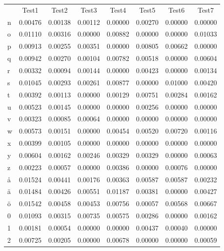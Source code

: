 \begin{tabularx}{\textwidth}{X|c|c|c|c|c|c|c}
 & Test1 & Test2 & Test3 & Test4 & Test5 & Test6 & Test7 \\%
n   & 0.00476 &  0.00138 &  0.00112 &  0.00000 &  0.00270 &  0.00000 &  0.00000  \\
o   & 0.01110 &  0.00316 &  0.00000 &  0.00882 &  0.00000 &  0.00000 &  0.01033  \\
p   & 0.00913 &  0.00255 &  0.00351 &  0.00000 &  0.00805 &  0.00662 &  0.00000  \\
q   & 0.00942 &  0.00270 &  0.00104 &  0.00782 &  0.00518 &  0.00000 &  0.00604  \\
r   & 0.00332 &  0.00094 &  0.00144 &  0.00000 &  0.00423 &  0.00000 &  0.00134  \\
s   & 0.01045 &  0.00293 &  0.00261 &  0.00877 &  0.00000 &  0.01000 &  0.00420  \\
t   & 0.00392 &  0.00113 &  0.00000 &  0.00129 &  0.00751 &  0.00284 &  0.00162  \\
u   & 0.00523 &  0.00145 &  0.00000 &  0.00000 &  0.00256 &  0.00000 &  0.00000  \\
v   & 0.00323 &  0.00085 &  0.00064 &  0.00000 &  0.00000 &  0.00000 &  0.00000  \\
w   & 0.00573 &  0.00151 &  0.00000 &  0.00454 &  0.00520 &  0.00720 &  0.00116  \\
x   & 0.00399 &  0.00105 &  0.00000 &  0.00000 &  0.00000 &  0.00000 &  0.00000  \\
y   & 0.00604 &  0.00162 &  0.00246 &  0.00329 &  0.00329 &  0.00000 &  0.00063  \\
z   & 0.00223 &  0.00057 &  0.00000 &  0.00386 &  0.00000 &  0.00076 &  0.00000  \\
å   & 0.01524 &  0.00441 &  0.00176 &  0.00363 &  0.00587 &  0.00587 &  0.00232  \\
ä   & 0.01484 &  0.00426 &  0.00551 &  0.01187 &  0.00381 &  0.00000 &  0.00427  \\
ö   & 0.01542 &  0.00458 &  0.00453 &  0.00756 &  0.00057 &  0.00568 &  0.00667  \\
0   & 0.01093 &  0.00315 &  0.00735 &  0.00575 &  0.00286 &  0.00000 &  0.00162  \\
1   & 0.00181 &  0.00054 &  0.00000 &  0.00000 &  0.00437 &  0.00040 &  0.00000  \\
2   & 0.00725 &  0.00205 &  0.00000 &  0.00678 &  0.00000 &  0.00000 &  0.00059  \\

\end{tabularx}

